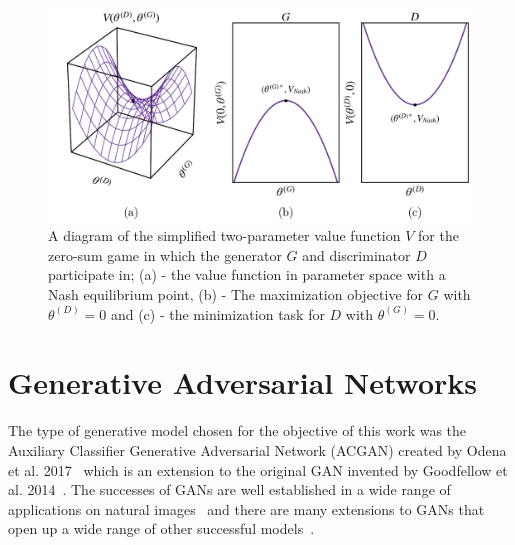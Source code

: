 \documentclass[twocolumn]{article}
\numberwithin{equation}{section}
\begin{document}
\begin{figure}%
\includegraphics[width=15cm]{figures/diagrams/gan_game.png}
\centering
\caption{A diagram of the simplified two-parameter value function $V$ for the zero-sum game in which the generator $G$ and 
discriminator $D$ participate in; (a) - the value function in parameter space with a Nash equilibrium point, (b) - The 
maximization objective for $G$ with $\theta^{(D)}=0$ and (c) - the minimization task for $D$ with $\theta^{(G)}=0$.}
\label{fig:gan_game}
\end{figure}


\section{Generative Adversarial Networks}\label{sec:gans}

The type of generative model chosen for the objective of this work was the Auxiliary Classifier Generative Adversarial 
Network (ACGAN) created by Odena et al. 2017~\cite{acgan} which is an extension to the original GAN invented by Goodfellow 
et al. 2014~\cite{gf_gan}. The successes of GANs are well established in a wide range of applications on natural 
images~\cite{wgan, karrasgan, largegan} and there are many extensions to GANs that open up a wide range of other successful models~\cite{pix2pix, hiresgan, lapgan}. 
\end{document}
